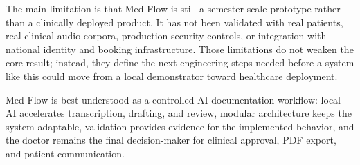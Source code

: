The main limitation is that Med Flow is still a semester-scale prototype rather than a clinically deployed product. It has not been validated with real patients, real clinical audio corpora, production security controls, or integration with national identity and booking infrastructure. Those limitations do not weaken the core result; instead, they define the next engineering steps needed before a system like this could move from a local demonstrator toward healthcare deployment.

\begin{summarybox}
Med Flow is best understood as a controlled AI documentation workflow: local AI accelerates transcription, drafting, and review, modular architecture keeps the system adaptable, validation provides evidence for the implemented behavior, and the doctor remains the final decision-maker for clinical approval, PDF export, and patient communication.
\end{summarybox}
